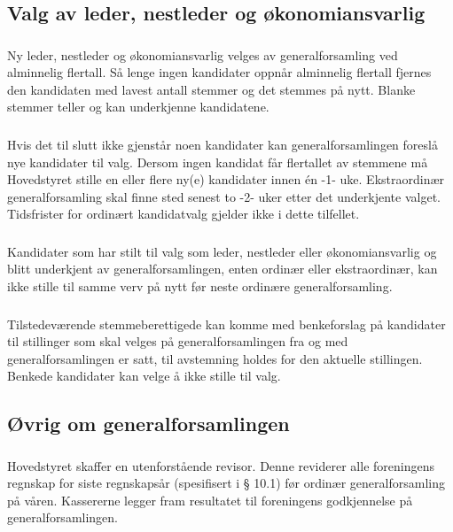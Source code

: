 \subsection{Valg av leder, nestleder og økonomiansvarlig}
\subsubsection{}
Ny leder, nestleder og økonomiansvarlig velges av generalforsamling ved
alminnelig flertall. Så lenge ingen kandidater oppnår alminnelig flertall
fjernes den kandidaten med lavest antall stemmer og det stemmes på nytt. Blanke
stemmer teller og kan underkjenne kandidatene.

\subsubsection{}
Hvis det til slutt ikke gjenstår noen kandidater kan generalforsamlingen
foreslå nye kandidater til valg. Dersom ingen
kandidat får flertallet av stemmene må Hovedstyret stille en eller flere ny(e)
kandidater innen én -1- uke. Ekstraordinær generalforsamling skal finne sted
senest to -2- uker etter det underkjente valget. Tidsfrister for ordinært
kandidatvalg gjelder ikke i dette tilfellet.

\subsubsection{}
Kandidater som har stilt til valg som leder, nestleder eller økonomiansvarlig
og blitt underkjent av generalforsamlingen, enten ordinær eller ekstraordinær, kan
ikke stille til samme verv på nytt før neste ordinære generalforsamling.

\subsubsection{}
Tilstedeværende stemmeberettigede kan komme med benkeforslag på kandidater til
stillinger som skal velges på generalforsamlingen fra og med
generalforsamlingen er satt, til avstemning holdes for den aktuelle stillingen.
Benkede kandidater kan velge å ikke stille til valg.

\subsection{Øvrig om generalforsamlingen}
\subsubsection{}
Hovedstyret skaffer en utenforstående revisor. Denne reviderer alle foreningens
regnskap for siste regnskapsår (spesifisert i § 10.1) før ordinær
generalforsamling på våren.  Kassererne legger fram resultatet til foreningens
godkjennelse på generalforsamlingen.

